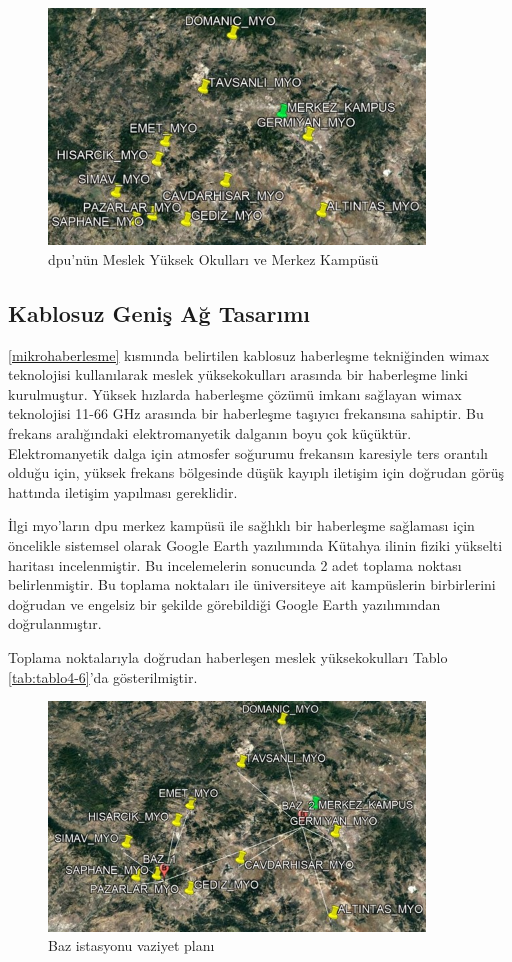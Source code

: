 \begin{figure}[htbp]
\centerline{\includegraphics[width=10cm]{Resim/sekil4-26.jpg}}
\caption{\gls{dpu}’nün Meslek Yüksek Okulları ve Merkez Kampüsü}
\label{fig:4-27}
\end{figure}


\subsection{Kablosuz Geniş Ağ Tasarımı}

\ref{mikrohaberlesme} kısmında belirtilen kablosuz haberleşme tekniğinden \gls{wimax} teknolojisi kullanılarak meslek yüksekokulları arasında bir haberleşme linki kurulmuştur. Yüksek hızlarda haberleşme çözümü imkanı sağlayan \gls{wimax} teknolojisi 11-66 GHz arasında bir haberleşme taşıyıcı frekansına sahiptir. Bu frekans aralığındaki elektromanyetik dalganın boyu çok küçüktür. Elektromanyetik dalga için atmosfer soğurumu frekansın karesiyle ters orantılı olduğu için, yüksek frekans bölgesinde düşük kayıplı iletişim için doğrudan görüş hattında iletişim yapılması gereklidir.

İlgi \gls{myo}'ların \gls{dpu} merkez kampüsü ile sağlıklı bir haberleşme sağlaması için öncelikle sistemsel olarak Google Earth yazılımında Kütahya ilinin fiziki yükselti haritası incelenmiştir. Bu incelemelerin sonucunda 2 adet toplama noktası belirlenmiştir. Bu toplama noktaları ile üniversiteye ait kampüslerin birbirlerini doğrudan ve engelsiz bir şekilde görebildiği Google Earth yazılımından doğrulanmıştır.

Toplama noktalarıyla doğrudan haberleşen meslek yüksekokulları Tablo \ref{tab:tablo4-6}'da gösterilmiştir.



\begin{figure}[htbp]
\centerline{\includegraphics[width=10cm]{Resim/sekil4-27.jpg}}
\caption{Baz istasyonu vaziyet planı}
\label{fig:4-28}
\end{figure}





